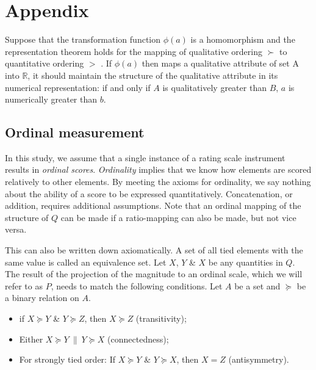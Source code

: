 \documentclass[titlepage, a4paper, 11pt]{article}
\begin{document}

\newpage


\newpage
\section*{Appendix}
\label{appendix}
Suppose that the transformation function $\phi(a)$ is a homomorphism and the representation theorem holds for the mapping of qualitative ordering $\succ$ to quantitative ordering $>$ \citep{krantz_foundations_1971}. If $\phi(a)$ then maps a qualitative attribute of set A into $\mathbb{R}$, it should maintain the structure of the qualitative attribute in its numerical representation: if and only if $A$ is qualitatively greater than $B$, $a$ is numerically greater than $b$.

\subsection{Ordinal measurement}
In this study, we assume that a single instance of a rating scale instrument results in \textit{ordinal scores}. \textit{Ordinality} implies that we know how elements are scored relatively to other elements. By meeting the axioms for ordinality, we say nothing about the ability of a score to be expressed quantitatively. Concatenation, or addition, requires additional assumptions. Note that an ordinal mapping of the structure of $Q$ can be made if a ratio-mapping can also be made, but not vice versa. 

This can also be written down axiomatically. A set of all tied elements with the same value is called an equivalence set. Let $X$, $Y$ \& $X$ be any quantities in $Q$. The result of the projection of the magnitude to an ordinal scale, which we will refer to as $P$, needs to match the following conditions. Let $A$ be a set and $\succeq$ be a binary relation on $A$. 

\begin{itemize}
    \item if $X \succeq Y$ \& $Y \succeq Z$, then $X \succeq Z$ (transitivity);
    \item Either $X \succeq Y\ \|\ Y \succeq X$ (connectedness);
    \item For strongly tied order: If $X \succeq Y$ \& $Y \succeq X$, then $X = Z$ (antisymmetry).
\end{itemize}
\end{document}
